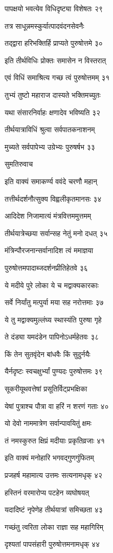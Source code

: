 पापक्षयो भवत्येव विधिदृष्ट्या विशेषतः २९

तत्र साधून्नमस्कुर्यात्पादवंदनसेवनैः

तद्द्वारा हरिभक्तिर्हि प्राप्यते पुरुषोत्तमे ३०

इति तीर्थविधिः प्रोक्तः समासेन न विस्तरात्

एवं विधिं समाश्रित्य गच्छ त्वं पुरुषोत्तमम् ३१

तुभ्यं तुष्टो महाराज दास्यते भक्तिमच्युतः

यथा संसारनिर्वाहः क्षणादेव भविष्यति ३२

तीर्थयात्राविधिं श्रुत्वा सर्वपातकनाशनम्

मुच्यते सर्वपापेभ्य उग्रेभ्यः पुरुषर्षभ ३३

सुमतिरुवाच

इति वाक्यं समाकर्ण्य ववंदे चरणौ महान्

तत्तीर्थदर्शनौत्सुक्य विह्वलीकृतमानसः ३४

आदिदेश निजामात्यं मंत्रवित्तममुत्तमम्

तीर्थयात्रेच्छया सर्वान्सह नेतुं मनो दधत् ३५

मंत्रिन्पौरजनान्सर्वानादिश त्वं ममाज्ञया

पुरुषोत्तमपादाब्जदर्शनप्रीतिहेतवे ३६

ये मदीये पुरे लोका ये च मद्वाक्यकारकाः

सर्वे निर्यांतु मत्पुर्या मया सह नरोत्तमाः ३७

ये तु मद्वाक्यमुल्लंघ्य स्थास्यंति पुरुषा गृहे

ते दंड्या यमदंडेन पापिनोऽधर्महेतवः ३८

किं तेन सुतवृंदेन बांधवैः किं सुदुर्नयैः

यैर्नदृष्टः स्वचक्षुर्भ्यां पुण्यदः पुरुषोत्तमः ३९

सूकरीयूथवत्तेषां प्रसूतिर्विट्प्रभक्षिका

येषां पुत्राश्च पौत्रा वा हरिं न शरणं गताः ४०

यो देवो नाममात्रेण सर्वान्पावयितुं क्षमः

तं नमस्कुरुत क्षिप्रं मदीयाः प्रकृतिव्रजाः ४१

इति वाक्यं मनोहारि भगवद्गुणगुंफितम्

प्रजहर्ष महामात्य उत्तमः सत्यनामधृक् ४२

हस्तिनं वरमारोप्य पटहेन व्यघोषयत्

यदादिष्टं नृपेणेह तीर्थयात्रां समिच्छता ४३

गच्छंतु त्वरिता लोका राज्ञा सह महागिरिम्

दृश्यतां पापसंहारी पुरुषोत्तमनामधृक् ४४

